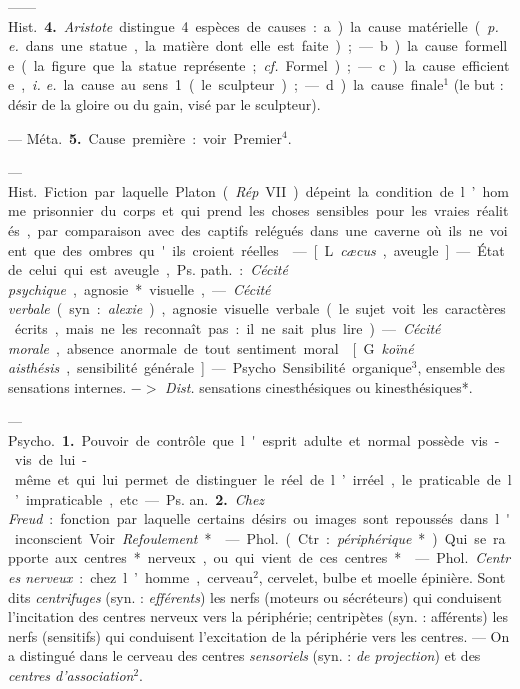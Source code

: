 \begin{itemize}[leftmargin=1cm, label=, itemsep=11pt]
—— \si{Hist.} {\bf 4.} {\it Aristote} distingue
4 espèces de causes : a) la cause matérielle ({\it p. e.} dans une statue, la
matière dont elle est faite); — b) la
cause formelle (la figure que la statue
représente; {\it cf.} Formel); — c) la
cause efficiente, {\it i. e.} la cause au sens 1
(le sculpteur); — d) la cause finale$^1$
(le but : désir de la gloire ou du gain,
visé par le sculpteur).

— \si{Méta.} {\bf 5.} Cause première : voir
Premier$^4$.

 — \si{Hist.}
Fiction par laquelle Platon ({\it Rép}
VII) dépeint la condition de l’homme
prisonnier du corps et qui prend les
%
choses sensibles pour les vraies réalités, par comparaison avec des
captifs relégués dans une caverne
où ils ne voient que des ombres
qu'ils croient réelles.

 — [L. {\it cæcus}, aveugle] — État
de celui qui est aveugle, \si{Ps. path.} :
{\it Cécité psychique}, agnosie* visuelle,
— {\it Cécité verbale} (syn. : {\it alexie}),
agnosie visuelle verbale (le sujet
voit les caractères écrits, mais ne les
reconnaît pas : il ne sait plus lire).
— {\it Cécité morale}, absence anormale
de tout sentiment moral.

 [G. {\it koïné
aisthésis}, sensibilité générale]. —
Psycho. Sensibilité organique$^3$, ensemble des sensations internes.
$->$ {\it Dist.} sensations cinesthésiques
ou kinesthésiques*.

 — \si{Psycho.} {\bf 1.} Pouvoir de
contrôle que l'esprit adulte et normal possède vis-vis de lui-même
et qui lui permet de distinguer le
réel de l’irréel, le praticable de l’impraticable, etc. — \si{Ps. an.} {\bf 2.} {\it Chez
Freud} : fonction par laquelle certains désirs ou images sont repoussés
dans l'inconscient. Voir {\it Refoulement}*.

 — \si{Phol.} (Ctr. : {\it périphérique}*).
Qui se rapporte aux centres* nerveux, ou qui vient de ces centres*.

 — \si{Phol.} {\it Centres nerveux} :
chez l’homme, cerveau$^2$, cervelet,
bulbe et moelle épinière. Sont dits
{\it centrifuges} (syn. : {\it efférents}) les nerfs
(moteurs ou sécréteurs) qui conduisent l'incitation des centres nerveux
vers la périphérie; centripètes (syn. :
afférents) les nerfs (sensitifs) qui
conduisent l'excitation de la périphérie vers les centres. — On a distingué dans le cerveau des centres
{\it sensoriels} (syn. : {\it de projection}) et des
{\it centres d'association}$^2$.


\end{itemize}
